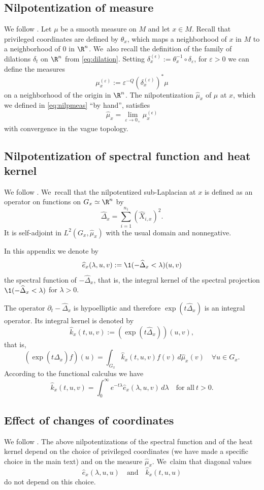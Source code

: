 \subsection{Nilpotentization of measure}
We follow \cite[\S A.5.6]{CHT1}. Let $\mu$ be a smooth measure on $M$ and let $x \in M$. Recall that privileged coordinates are defined by $\theta_x$, which maps a neighborhood of $x$ in $M$ to a neighborhood of $0$ in $\R^n$. We~also recall the definition of the family of dilations $\delta_t$ on $\R^n$ from \eqref{eq:dilation}. Setting $\delta_x^{(\epsilon)} := \theta_x^{-1} \circ \delta_\varepsilon$, for $\varepsilon>0$ we can define the measures
\[
\mu_x^{(\varepsilon)} := \varepsilon^{-Q}(\delta_x^{(\varepsilon)})^*\mu
\]
on a neighborhood of the origin in $\R^n$. The nilpotentization $\widehat\mu_x$ of $\mu$ at $x$, which we defined in \eqref{eq:nilpmeas} ``by hand'', satisfies
\[
\widehat{\mu}_x=\lim_{\varepsilon\to 0_+}\mu_x^{(\epsilon)}
\]
with convergence in the vague topology.

\subsection{Nilpotentization of spectral function and heat kernel}
We follow \cite[\S A.8.3]{CHT1}. We~recall that the nilpotentized sub-Laplacian at $x$ is defined as an operator on functions on $G_x\simeq \R^n$ by
\[
\widehat{\Delta}_x= \sum_{i=1}^{n_1} (\widehat{X}_{i,x})^2.
\]
It is self-adjoint in $L^2(G_x,\widehat\mu_x)$ with the usual domain and nonnegative.

In this appendix we denote by
\[
\widehat e_x(\lambda,u,v) := \1(-\widehat\Delta_x <\lambda)(u,v)
\]
the spectral function of $-\widehat\Delta_x$, that is, the integral kernel of the spectral projection $\1(-\widehat\Delta_x<\lambda)$ for $\lambda>0$.

The operator $\partial_t- \widehat{\Delta}_x$ is hypoelliptic and therefore $\exp (t \widehat \Delta_x)$ is an integral operator. Its integral kernel is denoted by
\[
\widehat k_x(t,u,v) := (\exp(t\widehat\Delta_x))(u,v),
\]
that is,
\[
(\exp(t \widehat \Delta_x) f)(u)= \int_{G_x} \widehat k_x(t,u,v) f(v)\,d \widehat{\mu}_x(v)
\quad \forall u\in G_x.
\]
According to the functional calculus we have
\begin{equation}
\label{eq:heatkernelspecfcn}
\widehat k_x(t,u,v) = \int_0^\infty e^{-t\lambda} \widehat e_x(\lambda,u,v)\,d\lambda
\quad\text{for all}\ t>0.
\end{equation}

\subsection{Effect of changes of coordinates}
We follow \cite[2nd part of App.\,A.8.2]{CHT1}. The above nilpotentizations of the spectral function and of the heat kernel depend on the choice of privileged coordinates (we have made a specific choice in the main text) and on the measure $\widehat\mu_x$. We~claim that diagonal values
\[
\widehat e_x(\lambda,u,u)
\quad\text{and}\quad
\widehat k_x(t,u,u)
\]
do not depend on this choice.

